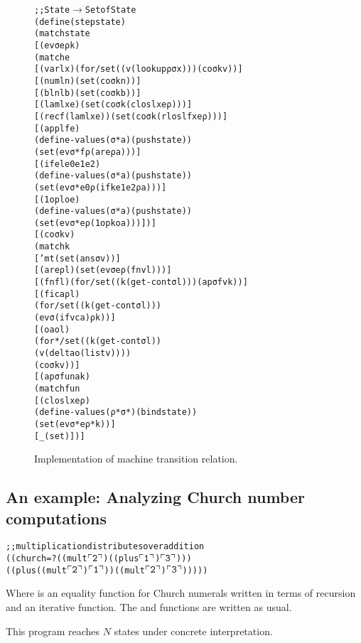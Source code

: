 \documentclass{llncs}
\begin{document}
\begin{figure}
\begin{alltt}
  ;; State \(\rightarrow\) Setof State
  (define (step state)
    (match state
      [(ev σ e ρ k)
       (match e
         [(var l x)           (for/set ((v (lookup ρ σ x))) (co σ k v))]
         [(num l n)           (set (co σ k n))]
         [(bln l b)           (set (co σ k b))]
         [(lam l x e)         (set (co σ k (clos l x e ρ)))]
         [(rec f (lam l x e)) (set (co σ k (rlos l f x e ρ)))]
         [(app l f e)
          (define-values (σ* a) (push state))
          (set (ev σ* f ρ (ar e ρ a)))]
         [(ife l e0 e1 e2)
          (define-values (σ* a) (push state))
          (set (ev σ* e0 ρ (ifk e1 e2 ρ a)))]
         [(1op l o e)
          (define-values (σ* a) (push state))
          (set (ev σ* e ρ (1opk o a)))])]
      [(co σ k v)
       (match k
         ['mt (set (ans σ v))]
         [(ar e ρ l) (set (ev σ e ρ (fn v l)))]
         [(fn f l)   (for/set ((k (get-cont σ l))) (ap σ f v k))]
         [(fi c a ρ l)
          (for/set ((k (get-cont σ l)))
            (ev σ (if v c a) ρ k))]
         [(oa o l)
          (for*/set ((k (get-cont σ l))
                     (v (delta o (list v))))
            (co σ k v))]
      [(ap σ fun a k)
       (match fun
         [(clos l x e ρ)
          (define-values (ρ* σ*) (bind state))
          (set (ev σ* e ρ* k))]
         [_ (set)])]
\end{alltt}
\caption{Implementation of machine transition relation.}
\end{figure}

\subsection{An example: Analyzing Church number computations}

\newcommand{\church}[1]{\(\ulcorner{\tt #1}\urcorner\)}

\begin{alltt}
;; multiplication distributes over addition
((church=? ((mult \church2) ((plus \church1) \church3)))
 ((plus ((mult \church2) \church1)) ((mult \church2) \church3)))))
\end{alltt}

Where  is an equality function for Church numerals
written in terms of recursion and an iterative  function.
The  and  functions are written as usual.

This program reaches $N$ states under concrete interpretation.
\end{document}
